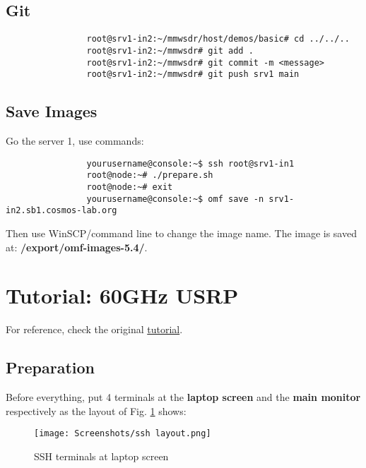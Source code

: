\documentclass{article}
\begin{document}
    \subsection{Git}
        \begin{verbatim}
                root@srv1-in2:~/mmwsdr/host/demos/basic# cd ../../..
                root@srv1-in2:~/mmwsdr# git add .
                root@srv1-in2:~/mmwsdr# git commit -m <message>
                root@srv1-in2:~/mmwsdr# git push srv1 main
            \end{verbatim}
            
    \subsection{Save Images}
            Go the server 1, use commands:
            \begin{verbatim}
                yourusername@console:~$ ssh root@srv1-in1
                root@node:~# ./prepare.sh
                root@node:~# exit
                yourusername@console:~$ omf save -n srv1-in2.sb1.cosmos-lab.org
            \end{verbatim}
            
            Then use WinSCP/command line to change the image name. The image is saved at: \textbf{/export/omf-images-5.4/}. 
        
        
        
\section{Tutorial: 60GHz USRP}        
For reference, check the original  \href{https://wiki.cosmos-lab.org/wiki/Tutorials/Wireless/mmwaveSB1}{tutorial}. 
    \subsection{Preparation}
    Before everything, put 4 terminals at the \textbf{laptop screen} and the \textbf{main monitor} respectively as the layout of Fig. \ref{fig: ssh layout} shows:
    \begin{figure}[ht]
        \centering
        \texttt{[image: Screenshots/ssh layout.png]}
        \caption{SSH terminals at laptop screen}
        \vspace*{0mm}
        \label{fig: ssh layout}
    \end{figure}
    
\end{document}
